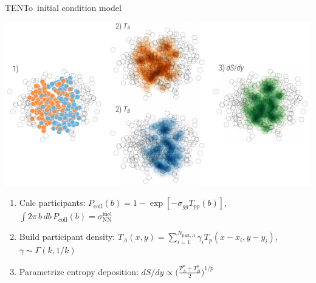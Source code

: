 \documentclass[xcolor=dvipsnames]{beamer}
\newcommand{\trento}{T\raisebox{-0.3ex}{R}ENTo}
\begin{document}
\begin{frame}{\trento\ initial condition model }
    
    \centering \bigskip \includegraphics{schematic}
    \begin{enumerate}
        \scriptsize \itemsep0.8pt
        \item Calc participants: $\displaystyle P_\text{coll}(b) = 
              1 - \exp[-\sigma_{gg} T_{pp}(b)]$, \quad $\displaystyle 
              \int 2 \pi\, b\, db\, P_\text{coll}(b) = 
              \sigma_\text{NN}^\text{inel}$ \\ \vspace{0.1 cm}
        \item Build participant density: $\displaystyle T_A(x,y) = 
              \sum\limits_{i=1}^{N_{\text{part},A}} \gamma_i 
              T_p(x-x_i, y-y_i)$, \quad $\displaystyle \gamma \sim 
              \Gamma(k, 1/k)$
        \item Parametrize entropy deposition: 
              $\displaystyle dS/dy \propto \bigg(\frac{T_A^p + T_B^p}{2} 
              \bigg)^{1/p}$
    \end{enumerate}
\end{frame}


\end{document}
